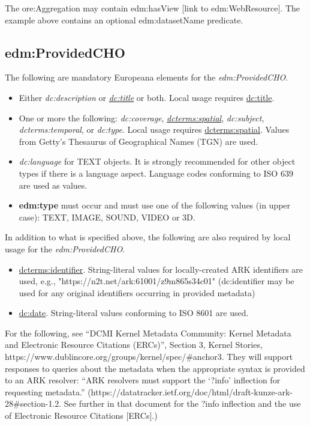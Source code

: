 \documentclass[11pt]{article}
\begin{document}
The ore:Aggregation may contain edm:hasView [link to edm:WebResource]. The example above contains an optional edm:datasetName predicate.

\subsection{edm:ProvidedCHO}
The following are mandatory Europeana elements for the \textit{edm:ProvidedCHO}.

\begin{itemize}

  \item Either \textit{dc:description} or \underline{\textit{dc:title}} or both. Local usage requires \underline{dc:title}.

  \item One or more the following: \textit{dc:coverage}, \underline{\textit{dcterms:spatial}}, \textit{dc:subject}, \textit{dcterms:temporal}, or \textit{dc:type}. Local usage requires \underline{dcterms:spatial}. Values from Getty's Thesaurus of Geographical Names (TGN) are used.

  \item \textit{dc:language} for TEXT objects. It is strongly recommended for other object types if there is a language aspect. Language codes conforming to ISO 639 are used as values.

  \item \textbf{edm:type} must occur and must use one of the following values (in upper case): TEXT, IMAGE, SOUND, VIDEO or 3D.
\end{itemize}

In addition to what is specified above, the following are also required by local usage for the \textit{edm:ProvidedCHO}.
\begin{itemize}
  \item \underline{dcterms:identifier}. String-literal values for locally-created ARK identifiers are used, e.g., "https://n2t.net/ark:61001/z9m865s34c01" (dc:identifier may be used for any original identifiers occurring in provided metadata)

  \item \underline{dc:date}. String-literal values conforming to ISO 8601 are used.

\end{itemize}

For the following, see ``DCMI Kernel Metadata Community: Kernel Metadata and Electronic Resource Citations (ERCs)'', Section 3, Kernel Stories, https://www.dublincore.org/groups/kernel/spec/\#anchor3. They will support responses to queries about the metadata when the appropriate syntax is provided to an ARK resolver: ``ARK resolvers must support the `?info' inflection for requesting metadata.'' (https://datatracker.ietf.org/doc/html/draft-kunze-ark-28\#section-1.2. See further in that document for the ?info inflection and the use of Electronic Resource Citations [ERCs].)
\end{document}
